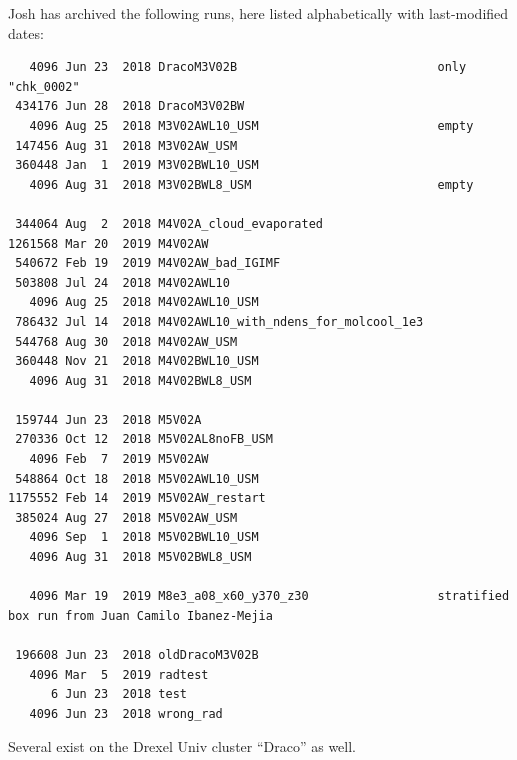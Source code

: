 \documentclass[10pt]{article}
\begin{document}
Josh has archived the following runs, here listed alphabetically with last-modified dates:
\begin{verbatim}
   4096 Jun 23  2018 DracoM3V02B							only "chk_0002"
 434176 Jun 28  2018 DracoM3V02BW
   4096 Aug 25  2018 M3V02AWL10_USM							empty
 147456 Aug 31  2018 M3V02AW_USM
 360448 Jan  1  2019 M3V02BWL10_USM
   4096 Aug 31  2018 M3V02BWL8_USM							empty

 344064 Aug  2  2018 M4V02A_cloud_evaporated
1261568 Mar 20  2019 M4V02AW
 540672 Feb 19  2019 M4V02AW_bad_IGIMF
 503808 Jul 24  2018 M4V02AWL10
   4096 Aug 25  2018 M4V02AWL10_USM
 786432 Jul 14  2018 M4V02AWL10_with_ndens_for_molcool_1e3
 544768 Aug 30  2018 M4V02AW_USM
 360448 Nov 21  2018 M4V02BWL10_USM
   4096 Aug 31  2018 M4V02BWL8_USM

 159744 Jun 23  2018 M5V02A
 270336 Oct 12  2018 M5V02AL8noFB_USM
   4096 Feb  7  2019 M5V02AW
 548864 Oct 18  2018 M5V02AWL10_USM
1175552 Feb 14  2019 M5V02AW_restart
 385024 Aug 27  2018 M5V02AW_USM
   4096 Sep  1  2018 M5V02BWL10_USM
   4096 Aug 31  2018 M5V02BWL8_USM

   4096 Mar 19  2019 M8e3_a08_x60_y370_z30					stratified box run from Juan Camilo Ibanez-Mejia

 196608 Jun 23  2018 oldDracoM3V02B
   4096 Mar  5  2019 radtest
      6 Jun 23  2018 test
   4096 Jun 23  2018 wrong_rad
\end{verbatim}

Several exist on the Drexel Univ cluster ``Draco'' as well.
\end{document}
